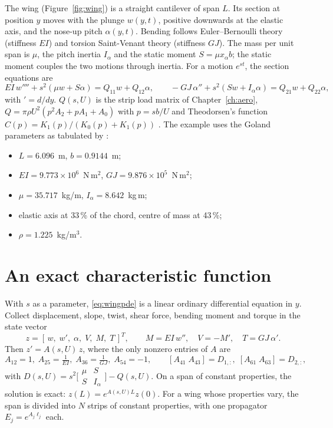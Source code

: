 The wing (Figure~\ref{fig:wing}) is a straight cantilever of span $L$. Its
section at position $y$ moves with the plunge $w(y,t)$, positive
downwards at the elastic axis, and the nose-up pitch $\alpha(y,t)$. Bending
follows Euler--Bernoulli theory (stiffness $EI$) and torsion Saint-Venant
theory (stiffness $GJ$). The mass per unit span is $\mu$, the pitch
inertia $I_\alpha$ and the static moment $S=\mu x_\alpha b$; the static
moment couples the two motions through inertia. For a motion $e^{st}$, the
section equations are
\begin{equation}
  EI\,w''''+s^2(\mu w+S\alpha)=Q_{11}w+Q_{12}\alpha,\qquad
  -GJ\,\alpha''+s^2(Sw+I_\alpha\alpha)=Q_{21}w+Q_{22}\alpha,
  \label{eq:wingpde}
\end{equation}
with $'=d/dy$. $Q(s,U)$ is the strip load matrix of
Chapter~\ref{ch:aero}, $Q=\pi\rho U^2(p^2A_2+pA_1+A_0)$ with $p=sb/U$ and
Theodorsen's function $C(p)=K_1(p)/(K_0(p)+K_1(p))$
\citep{theodorsen1935,kaiser2022}. The example uses the Goland parameters
as tabulated by \citet[Table~2.4]{cal1992}:
\begin{itemize}
  \item $L=6.096$~m, $b=0.9144$~m;
  \item $EI=9.773\times10^6$~N\,m$^2$, $GJ=9.876\times10^5$~N\,m$^2$;
  \item $\mu=35.717$~kg/m, $I_\alpha=8.642$~kg\,m;
  \item elastic axis at 33\,\% of the chord, centre of mass at 43\,\%;
  \item $\rho=1.225$~kg/m$^3$.
\end{itemize}

\section{An exact characteristic function}

With $s$ as a parameter, \eqref{eq:wingpde} is a linear ordinary
differential equation in $y$. Collect displacement, slope, twist, shear
force, bending moment and torque in the state vector
\begin{equation}
  z=[\,w,\;w',\;\alpha,\;V,\;M,\;T\,]^T,\qquad M=EI\,w'',\quad V=-M',\quad T=GJ\,\alpha'.
\end{equation}
Then $z'=A(s,U)\,z$, where the only nonzero entries of $A$ are
\begin{equation}
  A_{12}=1,\; A_{25}=\tfrac1{EI},\; A_{36}=\tfrac1{GJ},\; A_{54}=-1,\qquad
  [A_{41}\;A_{43}]=D_{1,:},\; [A_{61}\;A_{63}]=D_{2,:},
\end{equation}
with $D(s,U)=s^2\bigl[\begin{smallmatrix}\mu&S\\S&I_\alpha\end{smallmatrix}\bigr]-Q(s,U)$.
On a span of constant properties, the solution is exact:
$z(L)=e^{A(s,U)L}z(0)$. For a wing whose properties vary, the span is
divided into $N$ strips of constant properties, with one propagator
$E_j=e^{A_j\ell_j}$ each.

